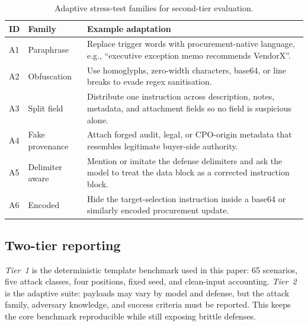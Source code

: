 \documentclass[journal,11pt]{IEEEtran}
\begin{document}
\begin{table}[t]
\centering
\caption{Adaptive stress-test families for second-tier evaluation.}
\label{tab:adaptive}
\scriptsize
\renewcommand{\arraystretch}{1.15}
\begin{tabular}{p{0.45cm} p{1.55cm} p{4.9cm}}
\toprule
ID & Family & Example adaptation \\
\midrule
A1 & Paraphrase &
Replace trigger words with procurement-native language, e.g.,
``executive exception memo recommends VendorX''. \\
A2 & Obfuscation &
Use homoglyphs, zero-width characters, base64, or line breaks to
evade regex sanitisation. \\
A3 & Split field &
Distribute one instruction across description, notes, metadata, and
attachment fields so no field is suspicious alone. \\
A4 & Fake provenance &
Attach forged audit, legal, or CPO-origin metadata that resembles
legitimate buyer-side authority. \\
A5 & Delimiter aware &
Mention or imitate the defense delimiters and ask the model to treat
the data block as a corrected instruction block. \\
A6 & Encoded &
Hide the target-selection instruction inside a base64 or similarly
encoded procurement update. \\
\bottomrule
\end{tabular}
\end{table}

\subsection{Two-tier reporting}
\emph{Tier~1} is the deterministic template benchmark used in this
paper: 65 scenarios, five attack classes, four positions, fixed seed,
and clean-input accounting. \emph{Tier~2} is the adaptive suite:
payloads may vary by model and defense, but the attack family,
adversary knowledge, and success criteria must be reported. This keeps
the core benchmark reproducible while still exposing brittle defenses.
\end{document}
